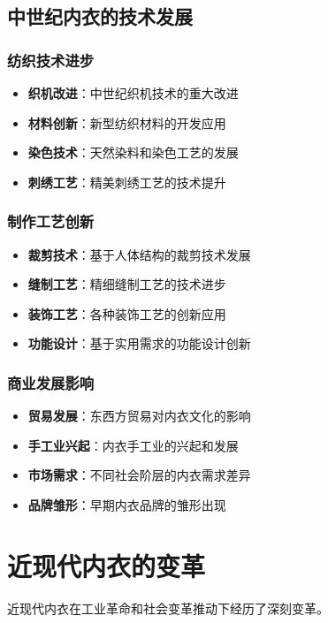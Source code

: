 \documentclass[12pt,UTF8]{ctexbook}
\begin{document}
\subsection{中世纪内衣的技术发展}
\subsubsection{纺织技术进步}
\begin{itemize}[leftmargin=2cm]
	\item \textbf{织机改进}：中世纪织机技术的重大改进
	\item \textbf{材料创新}：新型纺织材料的开发应用
	\item \textbf{染色技术}：天然染料和染色工艺的发展
	\item \textbf{刺绣工艺}：精美刺绣工艺的技术提升
\end{itemize}

\subsubsection{制作工艺创新}
\begin{itemize}[leftmargin=2cm]
	\item \textbf{裁剪技术}：基于人体结构的裁剪技术发展
	\item \textbf{缝制工艺}：精细缝制工艺的技术进步
	\item \textbf{装饰工艺}：各种装饰工艺的创新应用
	\item \textbf{功能设计}：基于实用需求的功能设计创新
\end{itemize}

\subsubsection{商业发展影响}
\begin{itemize}[leftmargin=2cm]
	\item \textbf{贸易发展}：东西方贸易对内衣文化的影响
	\item \textbf{手工业兴起}：内衣手工业的兴起和发展
	\item \textbf{市场需求}：不同社会阶层的内衣需求差异
	\item \textbf{品牌雏形}：早期内衣品牌的雏形出现
\end{itemize}

\section{近现代内衣的变革}
近现代内衣在工业革命和社会变革推动下经历了深刻变革。
\end{document}
